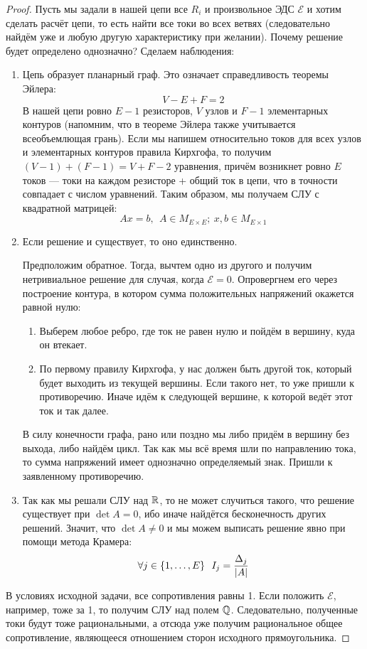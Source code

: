 \begin{proof}
	Пусть мы задали в нашей цепи все $R_i$ и произвольное ЭДС $\mathcal{E}$ и хотим сделать расчёт цепи, то есть найти все токи во всех ветвях (следовательно найдём уже и любую другую характеристику при желании). Почему решение будет определено однозначно? Сделаем наблюдения:
	\begin{enumerate}
		\item Цепь образует планарный граф. Это означает справедливость теоремы Эйлера:
		\[
			V - E + F = 2
		\]
		В нашей цепи ровно $E - 1$ резисторов, $V$ узлов и $F - 1$ элементарных контуров (напомним, что в теореме Эйлера также учитывается всеобъемлющая грань). Если мы напишем относительно токов для всех узлов и элементарных контуров правила Кирхгофа, то получим $(V - 1) + (F - 1) = V + F - 2$ уравнения, причём возникнет ровно $E$ токов --- токи на каждом резисторе + общий ток в цепи, что в точности совпадает с числом уравнений. Таким образом, мы получаем СЛУ с квадратной матрицей:
		\[
			Ax = b,\ \ A \in M_{E \times E};\ x, b \in M_{E \times 1}
		\]
		
		\item Если решение и существует, то оно единственно.
		
		Предположим обратное. Тогда, вычтем одно из другого и получим нетривиальное решение для случая, когда $\mathcal{E} = 0$. Опровергнем его через построение контура, в котором сумма положительных напряжений окажется равной нулю:
		\begin{enumerate}
			\item Выберем любое ребро, где ток не равен нулю и пойдём в вершину, куда он втекает.
			
			\item По первому правилу Кирхгофа, у нас должен быть другой ток, который будет выходить из текущей вершины. Если такого нет, то уже пришли к противоречию. Иначе идём к следующей вершине, к которой ведёт этот ток и так далее.
		\end{enumerate}
		В силу конечности графа, рано или поздно мы либо придём в вершину без выхода, либо найдём цикл. Так как мы всё время шли по направлению тока, то сумма напряжений имеет однозначно определяемый знак. Пришли к заявленному противоречию.
		
		\item Так как мы решали СЛУ над $\mathbb{R}$, то не может случиться такого, что решение существует при $\det A = 0$, ибо иначе найдётся бесконечность других решений. Значит, что $\det A \neq 0$ и мы можем выписать решение явно при помощи метода Крамера:
		\[
			\forall j \in \{1, \ldots, E\}\ \ I_j = \frac{\Delta_j}{|A|}
		\]
	\end{enumerate}

	В условиях исходной задачи, все сопротивления равны 1. Если положить $\mathcal{E}$, например, тоже за 1, то получим СЛУ над полем $\mathbb{Q}$. Следовательно, полученные токи будут тоже рациональными, а отсюда уже получим рациональное общее сопротивление, являющееся отношением сторон исходного прямоугольника.
\end{proof}